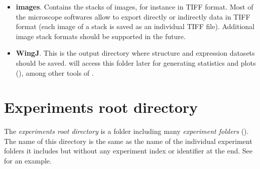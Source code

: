 \begin{itemize}
 \item \textbf{images}. Contains the stacks of images, for instance in TIFF format. Most of the microscope softwares allow to export directly or indirectly data in TIFF format (each image of a stack is saved as an individual TIFF file). Additional image stack formats should be supported in the future.
 \item \textbf{WingJ}. This is the output directory where structure and expression datasets should be saved. \wingjMatlab will access this folder later for generating statistics and plots (), among other tools of \wingj.
\end{itemize}

\section{Experiments root directory}\label{sec:root_directory}
The \textit{experiments root directory} is a folder including many \textit{experiment folders} (). The name of this directory is the same as the name of the individual experiment folders it includes but without any experiment index or identifier at the end. See  for an example.


